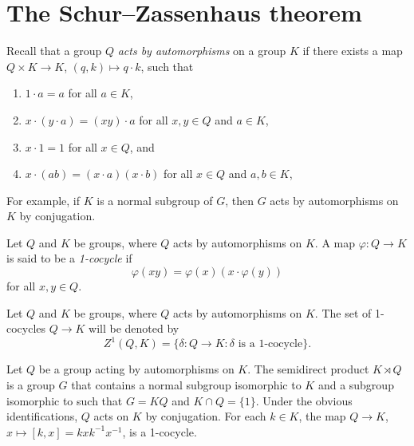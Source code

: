 
\section{The Schur--Zassenhaus theorem}


Recall that a group $Q$ \emph{acts by automorphisms} on a group $K$ if 
there exists a map $Q\times K\to K$, $(q,k)\mapsto q\cdot k$, 
such that 
\begin{enumerate}
    \item $1\cdot a=a$ for all $a\in K$, 
    \item $x\cdot (y\cdot a)=(xy)\cdot a$ for all $x,y\in Q$ and $a\in K$, 
    \item $x\cdot 1=1$ for all $x\in Q$, and 
    \item $x\cdot (ab)=(x\cdot a)(x\cdot b)$ for all $x\in Q$ and $a,b\in K$, 
\end{enumerate}
For example, if $K$ is a normal subgroup of $G$, 
then $G$ acts by automorphisms on $K$ by conjugation. 

\begin{definition}
Let $Q$ and $K$ be groups, where $Q$ acts by automorphisms on $K$. 
A map 
$\varphi\colon Q\to K$ is said to be a \emph{1-cocycle} if 
\[
	\varphi(xy)=\varphi(x)(x\cdot\varphi(y))
\]
for all $x,y\in Q$.  
\end{definition}

Let $Q$ and $K$ be groups, where $Q$ acts by automorphisms on $K$. 
The set of 1-cocycles $Q\to K$ will be denoted by 
\[
Z^1(Q,K)=\{\delta\colon Q\to K:\text{$\delta$ is a 1-cocycle}\}.
\]

\begin{example}
Let $Q$ be a group acting by automorphisms on $K$. 
The semidirect product $K\rtimes Q$ 
is a group $G$ that contains a normal subgroup isomorphic to $K$ 
and a subgroup isomorphic to such that 
$G=KQ$ and $K\cap Q=\{1\}$. Under the obvious identifications, 
$Q$ acts on $K$ by conjugation. For each $k\in K$, the map 
$Q\to K$, $x\mapsto [k,x]=kxk^{-1}x^{-1}$, is a 1-cocycle. 
\end{example}

